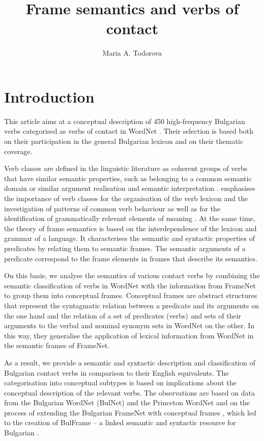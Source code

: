 \documentclass[output=paper,colorlinks,citecolor=brown]{langscibook}
\title{Frame semantics and verbs of contact}
\author{Maria A. Todorova\orcid{0000-0001-5866-7180}\affiliation{Department of Computational Linguistics, Institute for Bulgarian Language, Bulgarian Academy of Sciences}}
\begin{document}
\maketitle

\section{Introduction} 
This article aims at a conceptual description of 450 high-frequency Bulgarian verbs categorised as verbs of contact in WordNet \citep{Fellbaum:90}. Their selection is based both on their participation in the general Bulgarian lexicon and on their thematic coverage.

Verb classes are defined in the linguistic literature as coherent groups of verbs that have similar semantic properties, such as belonging to a common semantic domain \citep{Juffs:96} or similar argument realisation and semantic interpretation \citep{Fillmore:70, Levin:93, Kipper-Schuler2005}. \citet{Fillmore:70} emphasises the importance of verb classes for the organisation of the verb lexicon and the investigation of patterns of common verb behaviour as well as for the identification of grammatically relevant elements of meaning \citep [125]{Fillmore:70}. At the same time, the theory of frame semantics \citep{Fillmore1977, Ruppenhofer2016} is based on the interdependence of the lexicon and grammar of a language. It characterises the semantic and syntactic properties of predicates by relating them to semantic frames. The semantic arguments of a predicate correspond to the frame elements in frames that describe its semantics.

On this basis, we analyse the semantics of various contact verbs by combining the semantic classification of verbs in WordNet with the information from FrameNet \citep{Fillmore1982, Baker1998} to group them into conceptual frames. Conceptual frames \citep{svetla2021towards} are abstract structures that represent the syntagmatic relation between a predicate and its arguments on the one hand and the relation of a set of predicates (verbs) and sets of their arguments to the verbal and nominal synonym sets in WordNet on the other. In this way, they generalise the application of lexical information from WordNet in the semantic frames of FrameNet.

As a result, we provide a semantic and syntactic description and classification of Bulgarian contact verbs in comparison to their English equivalents. The categorisation into conceptual subtypes is based on implications about the conceptual description of the relevant verbs. The observations are based on data from the Bulgarian WordNet (BulNet) \citep{koeva2021-wordnet} and the Princeton WordNet \citep{Fellbaum:99a} and on the process of extending the Bulgarian FrameNet \citep{Koeva2010-framenet} with conceptual frames \citep{svetla2021towards}, which led to the creation of BulFrame -- a linked semantic and syntactic resource for Bulgarian \citep{KoevaDoychev:2022}.
\end{document}

